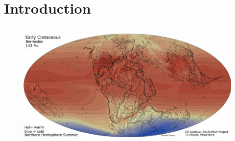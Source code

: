 \documentclass[aspectratio=169]{beamer} %
\begin{document}
{{\begin{frame}
\begin{flushright}
\begin{columns}
\begin{itemize}
         \end{itemize}
    \end{columns}

\end{flushright}


\end{frame} }



\section{Introduction}

{

{ \begin{frame}
	\vspace{1cm}
	\begin{center}
	\begin{large}
	\color{blue}{Pre-salt lakes}
	\end{large}
	\end{center}
\begin{flushright}
    \begin{columns}
        \centering
         \begin{figure}
		\centering
		\includegraphics[scale=0.23]{images/aptianoT.png}
	\end{figure}


\end{columns}
\end{flushright}
\end{frame}}}}
\end{document}
